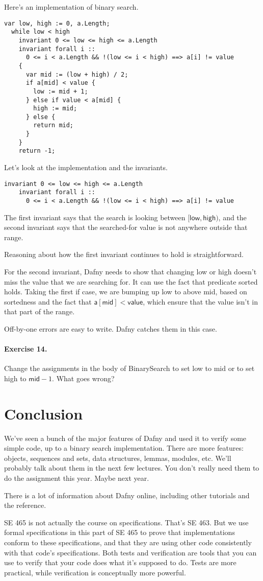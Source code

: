 \documentclass[11pt]{article}
\begin{document}
Here's an implementation of binary search.
\begin{lstlisting}[language=dafny]
  var low, high := 0, a.Length;
  while low < high
    invariant 0 <= low <= high <= a.Length
    invariant forall i ::
      0 <= i < a.Length && !(low <= i < high) ==> a[i] != value
    {   
      var mid := (low + high) / 2;
      if a[mid] < value {
        low := mid + 1;
      } else if value < a[mid] {
        high := mid;
      } else {
        return mid;
      }
    }
    return -1;
\end{lstlisting}
Let's look at the implementation and the invariants.
\begin{lstlisting}[language=dafny]
    invariant 0 <= low <= high <= a.Length
    invariant forall i ::
      0 <= i < a.Length && !(low <= i < high) ==> a[i] != value
\end{lstlisting}
The first invariant says that the search is looking between
$[\mathsf{low}, \mathsf{high})$, and the second invariant
says that the searched-for value is not anywhere outside
that range.

Reasoning about how the first invariant continues to hold is
straightforward.

For the second invariant, Dafny needs to show that changing
\textsf{low} or \textsf{high} doesn't miss the value that we are
searching for. It can use the fact that predicate \textsf{sorted}
holds. Taking the first \textsf{if} case, we are bumping up
\textsf{low} to above \textsf{mid}, based on sortedness and the fact
that $\mathsf{a}[\mathsf{mid}] < \mathsf{value}$, which ensure that
the value isn't in that part of the range.

Off-by-one errors are easy to write. Dafny catches them in this case.

\paragraph{Exercise 14.} Change the assignments in the body of
\textsf{BinarySearch} to set \textsf{low} to \textsf{mid} or
to set \textsf{high} to $\mathsf{mid}-1$. What goes wrong?

\section*{Conclusion}
We've seen a bunch of the major features of Dafny and used it to verify
some simple code, up to a binary search implementation. There are more
features: objects, sequences and sets, data structures, lemmas, modules, etc.
We'll probably talk about them in the next few lectures. You don't
really need them to do the assignment this year. Maybe next year.

There is a lot of information about Dafny online, including other
tutorials and the reference.

SE 465 is not actually the course on specifications. That's SE 463.
But we use formal specifications in this part of SE 465 to prove
that implementations conform to these specifications, and that
they are using other code consistently with that code's specifications.
Both tests and verification are tools that you can use to verify
that your code does what it's supposed to do. Tests are more
practical, while verification is conceptually more powerful.
\end{document}
